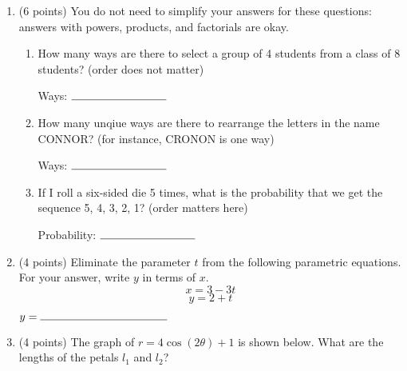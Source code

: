 \documentclass[11pt]{article}
\begin{document}
\begin{enumerate}
\newpage

\item (6 points) You do not need to simplify your answers for these questions: answers with powers, products, and factorials are okay.
\begin{enumerate}[itemsep=20pt, label={\alph*)}]
\item How many ways are there to select a group of 4 students from a class of 8 students? (order does not matter)
\vspace{40pt}
\begin{flushright}
Ways: $\rule{3cm}{0.4pt}$
\end{flushright}
\item How many unqiue ways are there to rearrange the letters in the name CONNOR? (for instance, CRONON is one way)
\vspace{40pt}
\begin{flushright}
Ways: $\rule{3cm}{0.4pt}$
\end{flushright}
\item If I roll a six-sided die 5 times, what is the probability that we get the sequence 5, 4, 3, 2, 1? (order matters here)
\vspace{40pt}
\begin{flushright}
Probability: $\rule{3cm}{0.4pt}$
\end{flushright}
\end{enumerate}

\vspace{20pt}

\item (4 points) Eliminate the parameter $t$ from the following parametric equations. For your answer, write $y$ in terms of $x$.
$$x = 3 - 3t$$
$$y = 2 + t$$
\vspace{50pt}
\begin{flushright}
$y = \rule{4cm}{0.4pt}$
\end{flushright}

\newpage

\vspace{20pt}

\item (4 points) The graph of $r = 4\cos(2\theta) + 1$ is shown below. What are the lengths of the petals $l_1$ and $l_2$?

\begin{center}
\end{center}


\end{enumerate}
\end{document}

